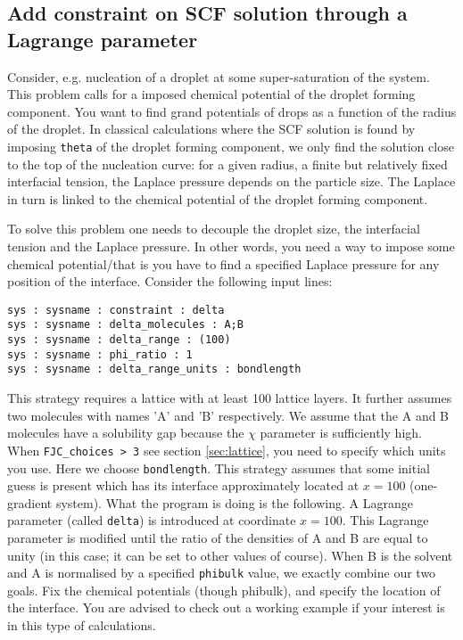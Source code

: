 \documentclass{article}
\begin{document}
\subsection{Add constraint on SCF solution through a Lagrange parameter}
\label{sec:deltaconstraint}
Consider, e.g. nucleation of a droplet at some super-saturation of the system. This problem calls for a imposed chemical potential of the droplet forming component. You want to find grand potentials of drops as a function of the radius of the droplet. In classical calculations where the SCF solution is found by imposing {\tt theta} of the droplet forming component, we only find the solution close to the top of the nucleation curve: for a given radius, a finite but relatively fixed interfacial tension, the Laplace pressure depends on the particle size. The Laplace in turn is linked to the chemical potential of the droplet forming component. 

To solve this problem one needs to decouple the droplet size, the interfacial tension and the Laplace pressure. In other words, you need a way to impose some chemical potential/that is you have to find a specified Laplace pressure for any position of the interface. Consider the following input lines:
\begin{verbatim}
sys : sysname : constraint : delta
sys : sysname : delta_molecules : A;B
sys : sysname : delta_range : (100)
sys : sysname : phi_ratio : 1
sys : sysname : delta_range_units : bondlength
\end{verbatim}
This strategy requires a lattice with at least 100 lattice layers.
It further assumes two molecules with names 'A' and 'B' respectively. We assume that the A and B molecules have a solubility gap because the $\chi$ parameter is sufficiently high. When {\tt FJC\_choices > 3} see section \ref{sec:lattice}, you need to specify which units you use. Here we choose {\tt bondlength}. This strategy assumes that some initial guess is present which has its interface approximately located at $x= 100$ (one-gradient system). What the program is doing is the following. A Lagrange parameter (called {\tt delta}) is introduced at coordinate $x = 100$. This Lagrange parameter is modified until the ratio of the densities of A and B are equal to unity (in this case; it can be set to other values of course). When B is the solvent and A is normalised by a specified {\tt phibulk} value, we exactly combine our two goals. Fix the chemical potentials (though phibulk), and specify the location of the interface. You are advised to check out a working example if your interest is in this type of calculations.
\end{document}
